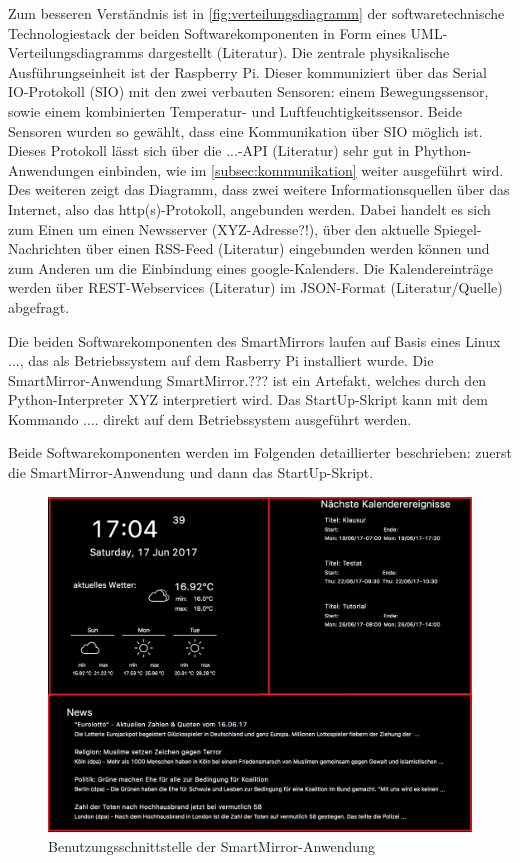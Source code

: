 Zum besseren Verständnis ist in \autoref{fig:verteilungsdiagramm} der softwaretechnische Technologiestack der beiden Softwarekomponenten in Form eines UML-Verteilungsdiagramms dargestellt (Literatur). Die zentrale physikalische Ausführungseinheit ist der Raspberry Pi. Dieser kommuniziert über das Serial IO-Protokoll (SIO) mit den zwei verbauten Sensoren: einem Bewegungssensor, sowie einem kombinierten Temperatur- und Luftfeuchtigkeitssensor. Beide Sensoren wurden so gewählt, dass eine Kommunikation über SIO möglich ist. Dieses Protokoll lässt sich über die ...-API (Literatur) sehr gut in Phython-Anwendungen einbinden, wie im \autoref{subsec:kommunikation} weiter ausgeführt wird. Des weiteren zeigt das Diagramm, dass zwei weitere Informationsquellen über das Internet, also das http(s)-Protokoll, angebunden werden. Dabei handelt es sich zum Einen um  
einen Newsserver (XYZ-Adresse?!), über den aktuelle Spiegel-Nachrichten über einen RSS-Feed (Literatur) eingebunden werden können und zum Anderen um die Einbindung eines google-Kalenders. Die Kalendereinträge werden über  REST-Webservices (Literatur) im JSON-Format (Literatur/Quelle) abgefragt. 

Die beiden Softwarekomponenten des SmartMirrors laufen auf Basis eines Linux ..., das als Betriebssystem auf dem Rasberry Pi installiert wurde. Die SmartMirror-Anwendung \glqq SmartMirror.??? \grqq ist ein Artefakt, welches durch den Python-Interpreter \glqq XYZ \grqq interpretiert wird. Das StartUp-Skript kann mit dem Kommando \glqq .... \grqq direkt auf dem Betriebssystem ausgeführt werden. 

Beide Softwarekomponenten werden im Folgenden detaillierter beschrieben: zuerst die SmartMirror-Anwendung und dann das StartUp-Skript.

\begin{figure}
	\centering
	\includegraphics[width=0.8\linewidth]{bilder/grafOberflaeche}
	\caption[Benutzungsschnittstelle der SmartMirror-Anwendung]{Benutzungsschnittstelle der SmartMirror-Anwendung}
	\label{fig:grafoberflaeche}
\end{figure}



